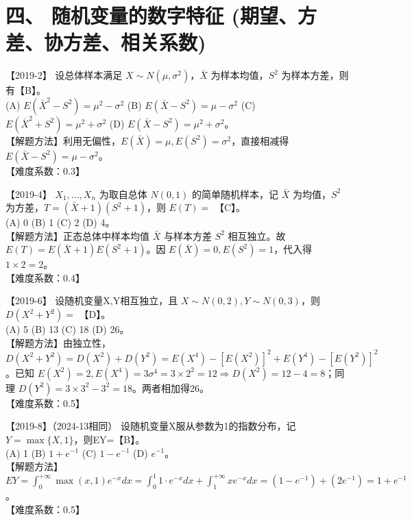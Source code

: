 \documentclass[zihao=4, a4paper, fontset=mac]{ctexart}
\begin{document}
\section*{四、 随机变量的数字特征 (期望、方差、协方差、相关系数)}

【2019-2】 设总体样本满足 $X\sim N(\mu,\sigma^2)$，$\bar{X}$ 为样本均值，$S^2$ 为样本方差，则有【B】。\\
(A) $E(\bar{X}^2-S^2)=\mu^2-\sigma^2$ \quad (B) $E(\bar{X}-S^2)=\mu-\sigma^2$ \quad (C) $E(\bar{X}^2+S^2)=\mu^2+\sigma^2$ \quad (D) $E(\bar{X}-S^2)=\mu^2+\sigma^2$。\\
【解题方法】利用无偏性，$E(\bar{X})=\mu, E(S^2)=\sigma^2$，直接相减得 $E(\bar{X}-S^2)=\mu-\sigma^2$。\\
【难度系数：0.3】

\par\vspace{\baselineskip}

【2019-4】 $X_1,...,X_n$ 为取自总体 $N(0,1)$ 的简单随机样本，记 $\bar{X}$ 为均值，$S^2$ 为方差，$T=(\bar{X}+1)(S^2+1)$，则 $E(T)=$ 【C】。\\
(A) 0 \quad (B) 1 \quad (C) 2 \quad (D) 4。\\
【解题方法】正态总体中样本均值 $\bar{X}$ 与样本方差 $S^2$ 相互独立。故 $E(T)=E(\bar{X}+1)E(S^2+1)$。因 $E(\bar{X})=0, E(S^2)=1$，代入得 $1 \times 2 = 2$。\\
【难度系数：0.4】

\par\vspace{\baselineskip}

【2019-6】 设随机变量X,Y相互独立，且 $X\sim N(0,2), Y\sim N(0,3)$，则 $D(X^2+Y^2)=$ 【D】。\\
(A) 5 \quad (B) 13 \quad (C) 18 \quad (D) 26。\\
【解题方法】由独立性，$D(X^2+Y^2)=D(X^2)+D(Y^2) = E(X^4)-[E(X^2)]^2 + E(Y^4)-[E(Y^2)]^2$。已知 $E(X^2)=2, E(X^4)=3\sigma^4=3\times2^2=12 \Rightarrow D(X^2)=12-4=8$；同理 $D(Y^2)=3\times3^2-3^2=18$。两者相加得26。\\
【难度系数：0.5】

\par\vspace{\baselineskip}

【2019-8】（2024-13相同） 设随机变量X服从参数为1的指数分布，记 $Y=\max\{X,1\}$，则EY=【B】。\\
(A) 1 \quad (B) $1+e^{-1}$ \quad (C) $1-e^{-1}$ \quad (D) $e^{-1}$。\\
【解题方法】$EY = \int_0^{+\infty} \max(x,1)e^{-x}dx = \int_0^1 1\cdot e^{-x}dx + \int_1^{+\infty} x e^{-x}dx = (1-e^{-1}) + (2e^{-1}) = 1+e^{-1}$。\\
【难度系数：0.5】
\end{document}
